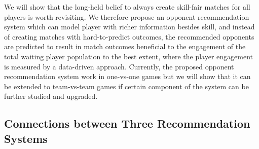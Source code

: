 We will show that the long-held belief to always create skill-fair matches for all players is worth revisiting. We therefore propose an opponent recommendation system which can model player with richer information besides skill, and instead of creating matches with hard-to-predict outcomes, the recommended opponents are predicted to result in match outcomes beneficial to the engagement of the total waiting player population to the best extent, where the player engagement is measured by a data-driven approach. Currently, the proposed opponent recommendation system work in one-vs-one games but we will show that it can be extended to team-vs-team games if certain component of the system can be further studied and upgraded.  








\subsection{Connections between Three Recommendation Systems}

